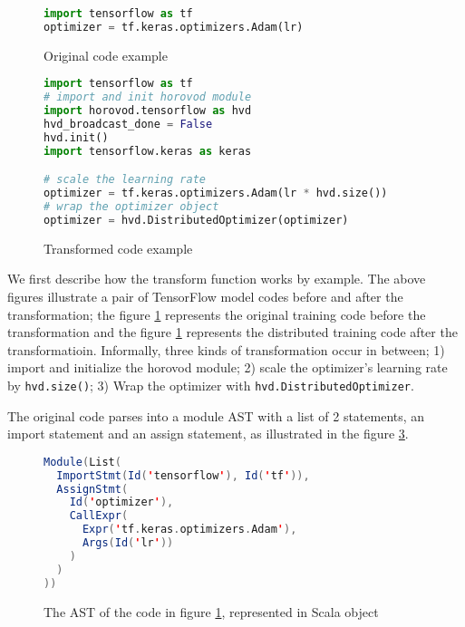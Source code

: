 
\begin{figure}[h]
\begin{lstlisting}[language=Python]
import tensorflow as tf
optimizer = tf.keras.optimizers.Adam(lr)
\end{lstlisting}
  \caption{Original code example}
  \label{fig:trans:org}
\end{figure}

\begin{figure}[h]
\begin{lstlisting}[language=Python]
import tensorflow as tf
# import and init horovod module
import horovod.tensorflow as hvd
hvd_broadcast_done = False
hvd.init()
import tensorflow.keras as keras

# scale the learning rate
optimizer = tf.keras.optimizers.Adam(lr * hvd.size())
# wrap the optimizer object
optimizer = hvd.DistributedOptimizer(optimizer)
\end{lstlisting}
  \caption{Transformed code example}
  \label{fig:trans:hvd}
\end{figure}

We first describe how the transform function works by example.
The above figures illustrate a pair of TensorFlow model codes
before and after the transformation;
the figure \ref{fig:trans:org} represents the original
training code before the transformation and
the figure \ref{fig:trans:org} represents the distributed
training code after the transformatioin.
Informally, three kinds of transformation occur in between;
1) import and initialize the horovod module;
2) scale the optimizer's learning rate by {\tt hvd.size()};
3) Wrap the optimizer with {\tt hvd.DistributedOptimizer}.

The original code parses into a module AST with a list of 2 statements,
an import statement and an assign statement, 
as illustrated in the figure \ref{fig:trans:ast}. 

\begin{figure}[h]
\begin{lstlisting}[language=Scala]
Module(List(
  ImportStmt(Id('tensorflow'), Id('tf')),
  AssignStmt(
    Id('optimizer'), 
    CallExpr(
      Expr('tf.keras.optimizers.Adam'),
      Args(Id('lr'))
    )
  )
))
\end{lstlisting}
  \caption{The AST of the code in figure \ref{fig:trans:org}, represented in Scala object}
  \label{fig:trans:ast}
\end{figure}

